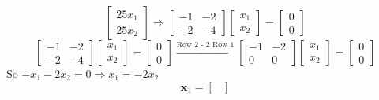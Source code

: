 \begin{enumerate}[label=(\alph*)]
\[\begin{bmatrix}
                    25 x_1\\
                    25 x_2
                \end{bmatrix}
                \Rightarrow
                \begin{bmatrix}
                    -1 & -2 \\
                    -2 & -4
                \end{bmatrix}
                \begin{bmatrix}
                    x_1 \\
                    x_2
                \end{bmatrix}
                =
                \begin{bmatrix}
                    0 \\
                    0
                \end{bmatrix}
            \]
            \[
                \begin{bmatrix}
                    -1 & -2 \\
                    -2 & -4
                \end{bmatrix}
                \begin{bmatrix}
                    x_1 \\
                    x_2
                \end{bmatrix}
                =
                \begin{bmatrix}
                    0 \\
                    0
                \end{bmatrix}
                \overset{\text{Row 2 - 2 Row 1}}{\longrightarrow}
                \begin{bmatrix}
                    -1 & -2 \\
                    0 & 0
                \end{bmatrix}
                \begin{bmatrix}
                    x_1 \\
                    x_2
                \end{bmatrix}
                =
                \begin{bmatrix}
                    0 \\
                    0
                \end{bmatrix}
            \]
            So $-x_1 - 2x_2 = 0 \Rightarrow x_1 = -2x_2$
            \[
                \mathbf{x}_1
                =
                \begin{bmatrix}

\end{bmatrix}\]
\end{enumerate}
